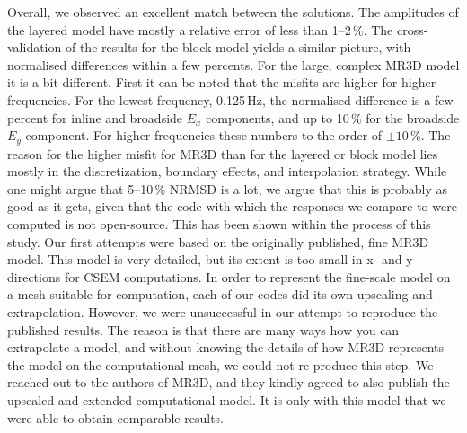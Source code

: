 \documentclass[extra, camera,%
]{gji}
\begin{document}
Overall, we observed an excellent match between the solutions. The amplitudes  of the layered model have mostly a relative error of less than 1--2\,\%.  The cross-validation of the results for the block model yields a similar picture, with normalised differences within a few percents. For the large, complex MR3D model it is a bit different. First it can be noted that the misfits are higher for higher frequencies. For the lowest frequency, 0.125\,Hz, the normalised difference is a few percent for inline and broadside $E_x$ components, and up to 10\,\% for the broadside $E_y$ component. For higher frequencies these numbers  to the order of $\pm10\,$\%. The reason for the higher misfit for MR3D than for the layered or block model lies mostly in the discretization, boundary effects, and interpolation strategy. While one might argue that 5--10\,\% NRMSD is a lot, we argue that this is probably as good as it gets, given that the code with which the responses we compare to were computed is not open-source. This has been shown within the process of this study. Our first attempts were based on the originally published, fine MR3D model. This model is very detailed, but its extent is too small in  x- and y-directions for CSEM computations. In order to represent the fine-scale model on a mesh suitable for computation, each of our codes did its own upscaling and extrapolation. However, we were unsuccessful in our attempt to reproduce the published results.  The reason is that there are many ways how you can extrapolate a model, and without knowing the details of how MR3D represents the model on the computational mesh, we could not re-produce this step. We reached out to the authors of MR3D, and they kindly agreed to also publish the upscaled and extended computational model. It is only with this model that we were able to obtain comparable results.
\end{document}
